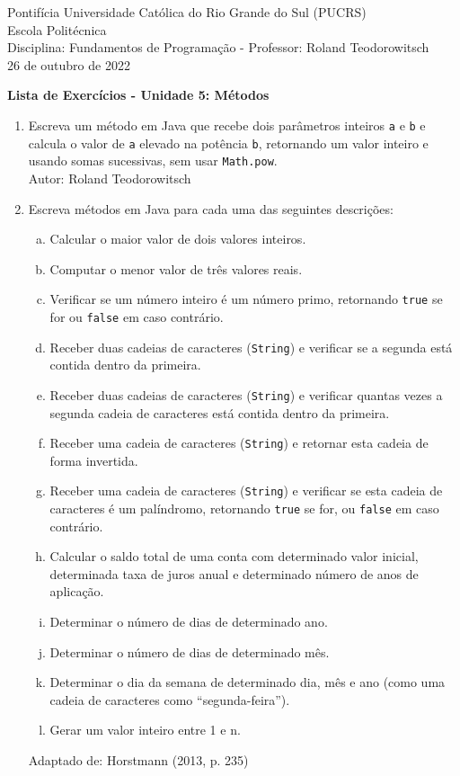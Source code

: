 \documentclass[onecolumn,a4paper,10pt]{report}
\newcommand{\+}{\, + \,}
\newcommand{\<}{\hspace*{-0.4cm}}
\begin{document}
\singlespacing

\begin{center}
Pontifícia Universidade Católica do Rio Grande do Sul (PUCRS)\\
Escola Politécnica\\
Disciplina: Fundamentos de Programação - Professor: Roland Teodorowitsch\\
26 de outubro de 2022
\end{center}

\begin{center}
\textbf{Lista de Exercícios - Unidade 5: Métodos}
\end{center}

\begin{enumerate}

\item Escreva um método em Java que recebe dois parâmetros inteiros \texttt{a} e \texttt{b} e calcula o valor de \texttt{a} elevado na potência \texttt{b}, retornando um valor inteiro e usando somas sucessivas, sem usar \texttt{Math.pow}.\\
{\tiny Autor: Roland Teodorowitsch}

\item Escreva métodos em Java para cada uma das seguintes descrições:
\begin{enumerate}[a.]
	\item Calcular o maior valor de dois valores inteiros.
	\item Computar o menor valor de três valores reais.
	\item Verificar se um número inteiro é um número primo, retornando \texttt{true} se for ou \texttt{false} em caso contrário.
	\item Receber duas cadeias de caracteres (\texttt{String}) e verificar se a segunda está contida dentro da primeira.
	\item Receber duas cadeias de caracteres (\texttt{String}) e verificar quantas vezes a segunda cadeia de caracteres está contida dentro da primeira. %
	\item Receber uma cadeia de caracteres (\texttt{String}) e retornar esta cadeia de forma invertida.
	\item Receber uma cadeia de caracteres (\texttt{String}) e verificar se esta cadeia de caracteres é um palíndromo, retornando \texttt{true} se for, ou \texttt{false} em caso contrário.
	\item Calcular o saldo total de uma conta com determinado valor inicial, determinada taxa de juros anual e determinado número de anos de aplicação.
	\item Determinar o número de dias de determinado ano. %
	\item Determinar o número de dias de determinado mês. %
	\item Determinar o dia da semana de determinado dia, mês e ano (como uma cadeia de caracteres como ``segunda-feira'').
	\item Gerar um valor inteiro entre 1 e n.
\end{enumerate}
{\tiny Adaptado de: Horstmann (2013, p. 235)}


\end{enumerate}
\end{document}
